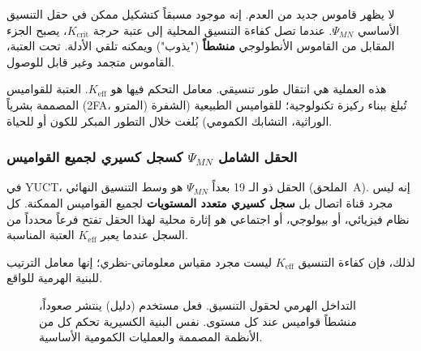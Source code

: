 \documentclass[12pt,a4paper]{article}
\theoremstyle{remark}
\begin{document}
	لا يظهر قاموس جديد من العدم. إنه موجود مسبقاً كتشكيل ممكن في حقل التنسيق الأساسي \(\Psi_{MN}\). عندما تصل كفاءة التنسيق المحلية إلى عتبة حرجة \(K_{\mathrm{crit}}\)، يصبح الجزء المقابل من القاموس الأنطولوجي \textbf{منشطاً} ("يذوب") ويمكنه تلقي الأدلة. تحت العتبة، القاموس متجمد وغير قابل للوصول.
	
	هذه العملية هي انتقال طور تنسيقي. معامل التحكم فيها هو \(K_{\mathrm{eff}}\). العتبة للقواميس المصممة بشرياً (2FA، المترو) تُبلغ ببناء ركيزة تكنولوجية؛ للقواميس الطبيعية (الشفرة الوراثية، التشابك الكمومي) بُلغت خلال التطور المبكر للكون أو للحياة.
	
	\subsubsection{الحقل الشامل \(\Psi_{MN}\) كسجل كسيري لجميع القواميس}
	
	في YUCT، الحقل ذو الـ 19 بعداً \(\Psi_{MN}\) هو وسط التنسيق النهائي (الملحق~A). إنه ليس مجرد قناة اتصال بل \textbf{سجل كسيري متعدد المستويات} لجميع القواميس الممكنة. كل نظام فيزيائي، أو بيولوجي، أو اجتماعي هو إثارة محلية لهذا الحقل تفتح فرعاً محدداً من السجل عندما يعبر \(K_{\mathrm{eff}}\) العتبة المناسبة.
	
	لذلك، فإن كفاءة التنسيق \(K_{\mathrm{eff}}\) ليست مجرد مقياس معلوماتي-نظري؛ إنها معامل الترتيب للبنية الهرمية للواقع.
	
	\begin{otherlanguage}{english}
		\begin{figure}[htbp]
			\centering
			\caption{التداخل الهرمي لحقول التنسيق. فعل مستخدم (دليل) ينتشر صعوداً، منشطاً قواميس عند كل مستوى. نفس البنية الكسيرية تحكم كل من الأنظمة المصممة والعمليات الكمومية الأساسية.}
			\label{fig:hierarchy}
		\end{figure}
	\end{otherlanguage}
	
\end{document}
